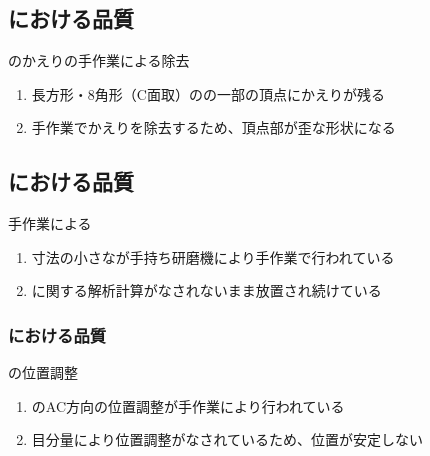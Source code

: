 \subsection{\KeywayMilling における品質}

\begin{Issues}{\KeywayMilling のかえりの手作業による除去}
\begin{enumerate}[label=\sarrow]
\item[{\sarrow[red]}]長方形・8角形（C面取）の\KeywayMilling の一部の頂点にかえりが残る
\item[{\sarrow[red]}]手作業でかえりを除去するため、頂点部が歪な形状になる
\end{enumerate}
\end{Issues}


\clearpage
\subsection{\EndFaceChamferMilling における品質}

\begin{Issues}{手作業による\EndFaceChamferMilling}
\begin{enumerate}[label=\sarrow]
\item[{\sarrow[red]}]
寸法の小さな\EndFaceChamferMilling が手持ち研磨機により手作業で行われている
\item[{\sarrow[red]}]\EndFaceChamferMilling に関する解析計算がなされないまま放置され続けている
\end{enumerate}
\end{Issues}

\subsubsection{\EndFaceOutCChamferMilling における品質}

\begin{Issues}{\EndFaceOutCChamferMilling の位置調整}
\begin{enumerate}[label=\sarrow]
\item[{\sarrow[red]}]\EndFaceOutCChamferMilling のAC方向の位置調整が手作業により行われている
\item[{\sarrow[red]}]目分量により位置調整がなされているため、位置が安定しない
\end{enumerate}
\end{Issues}

